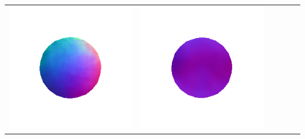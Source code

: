 \begin{center}
\begin{tabularx}{\linewidth}{@{}Y@{}Y@{}Y@{}Y@{}Y@{}Y@{}}
\includegraphics[width=\linewidth]{semisynthetic/20160617_1_marrnet_out.png} &
\includegraphics[width=\linewidth]{semisynthetic/20160617_1_ef_out.png} \\

\end{tabularx}
\end{center}
